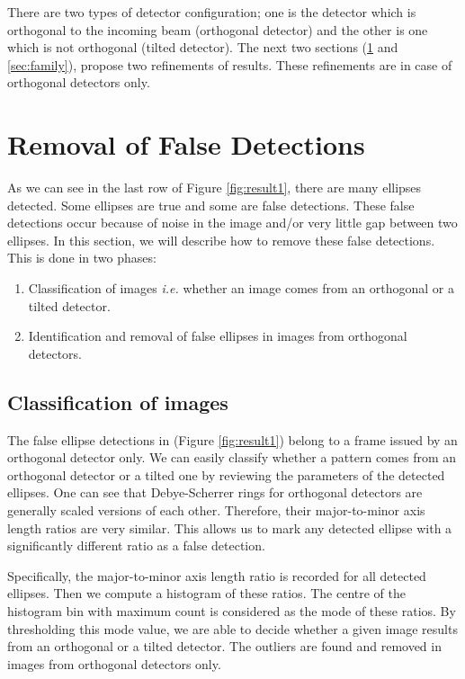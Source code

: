 \documentclass[preprint]{iucr}              %
\newcommand\dsrs{Debye-Scherrer rings}
\begin{document}
There are two types of detector configuration; one is the detector which is
orthogonal to the incoming beam (orthogonal detector) and the other is one which
is not orthogonal (tilted detector).  
The next two sections (\ref{sec:removalFD} and \ref{sec:family}), propose two
refinements of results. 
These refinements are in case of orthogonal detectors only.

\section{Removal of False Detections}
\label{sec:removalFD}
As we can see in the last row of Figure \ref{fig:result1}, there are many
ellipses detected. 
Some ellipses are true and some are false detections.
These false detections occur because of noise in the image and/or very little
gap between two ellipses. 
In this section, we will describe how to remove these false detections.
This is done in two phases:
\begin{enumerate}
    \item Classification of images \emph{i.e.} whether an image comes from an
    orthogonal or a tilted detector. 
    \item Identification and removal of false ellipses in images from orthogonal
    detectors. 
\end{enumerate}

\subsection{Classification of images}
The false ellipse detections in  (Figure \ref{fig:result1}) belong to a frame
issued by an orthogonal detector only. 
We can easily classify whether a pattern comes from an orthogonal detector or a
tilted one by reviewing the parameters of the detected ellipses. 
One can see that \dsrs{} for orthogonal detectors are generally scaled versions
of each other. 
Therefore, their major-to-minor axis length ratios are very similar.
This allows us to mark any detected ellipse with a significantly different ratio
as a false detection. 

Specifically, the major-to-minor axis length ratio is recorded for all detected
ellipses. 
Then we compute a histogram of these ratios.
The centre of the histogram bin with maximum count is considered as the mode of
these ratios. 
By thresholding this mode value, we are able to decide whether a given image
results from an orthogonal or a tilted detector. 
The outliers are found and removed in images from orthogonal detectors only.
\end{document}

